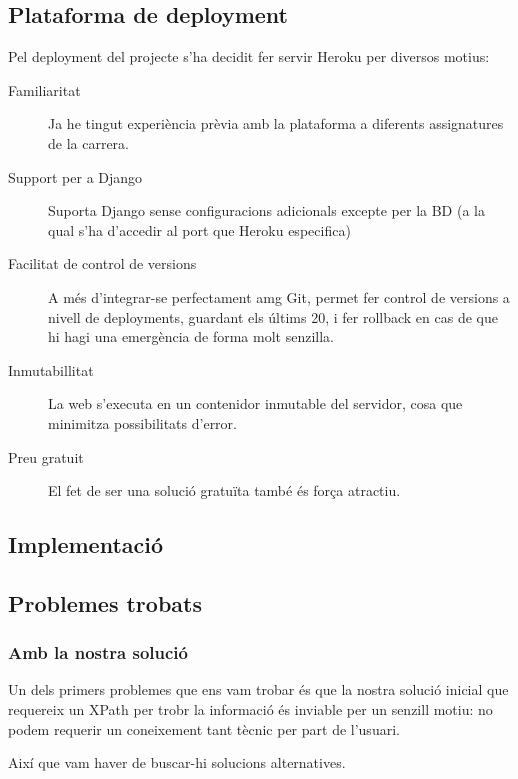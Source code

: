 \documentclass{article}
\begin{document}
\newpage

\subsection{Plataforma de deployment}

Pel deployment del projecte s'ha decidit fer servir Heroku per diversos motius:

\begin{description}
    \item[Familiaritat] Ja he tingut experiència prèvia amb la plataforma a diferents assignatures de la carrera.
    \item[Support per a Django] Suporta Django sense configuracions adicionals excepte per la BD (a la qual s'ha d'accedir al port que Heroku especifica)
    \item[Facilitat de control de versions] A més d'integrar-se perfectament amg Git, permet fer control de versions a nivell de deployments, guardant els últims 20, i fer rollback en cas de que hi hagi una emergència de forma molt senzilla.
    \item[Inmutabillitat] La web s'executa en un contenidor inmutable del servidor, cosa que minimitza possibilitats d'error.
    \item[Preu gratuit] El fet de ser una solució gratuïta també és força atractiu.
\end{description}

\newpage

\subsection{Implementació}

\newpage

\subsection{Problemes trobats}

\subsubsection{Amb la nostra solució}

Un dels primers problemes que ens vam trobar és que la nostra solució inicial que requereix un XPath per trobr la informació és inviable per un senzill motiu: no podem requerir un coneixement tant tècnic per part de l'usuari.

Així que vam haver de buscar-hi solucions alternatives.
\end{document}
